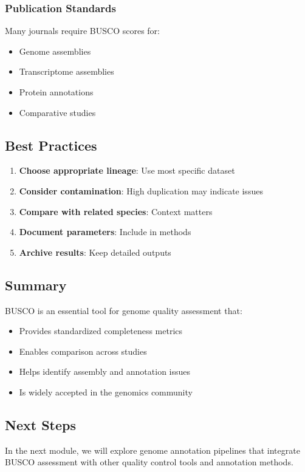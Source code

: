 \subsubsection{Publication Standards}
Many journals require BUSCO scores for:
\begin{itemize}
    \item Genome assemblies
    \item Transcriptome assemblies
    \item Protein annotations
    \item Comparative studies
\end{itemize}

\subsection{Best Practices}

\begin{enumerate}
    \item \textbf{Choose appropriate lineage}: Use most specific dataset
    \item \textbf{Consider contamination}: High duplication may indicate issues
    \item \textbf{Compare with related species}: Context matters
    \item \textbf{Document parameters}: Include in methods
    \item \textbf{Archive results}: Keep detailed outputs
\end{enumerate}

\subsection{Summary}

BUSCO is an essential tool for genome quality assessment that:
\begin{itemize}
    \item Provides standardized completeness metrics
    \item Enables comparison across studies
    \item Helps identify assembly and annotation issues
    \item Is widely accepted in the genomics community
\end{itemize}

\subsection{Next Steps}

In the next module, we will explore genome annotation pipelines that integrate BUSCO assessment with other quality control tools and annotation methods.